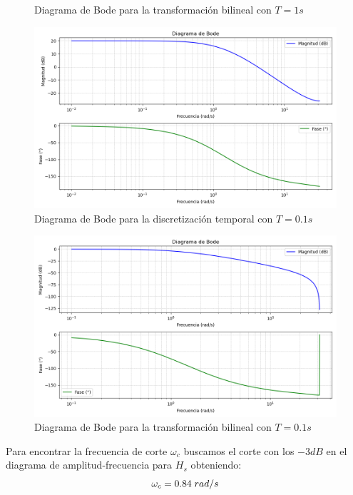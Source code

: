 \documentclass[a4paper,12pt]{report}
\begin{document}
\begin{enumerate}[label=\alph*), left=0pt]
\begin{figure}[H]
                \caption{Diagrama de Bode para la transformación bilineal con $T=1s$}
              \end{figure}
              \begin{figure}[H]
                \centering
                \includegraphics[width=1\linewidth]{./images/BodeD2.png}
                \caption{Diagrama de Bode para la discretización temporal con $T=0.1s$}
              \end{figure}
              \begin{figure}[H]
                \centering
                \includegraphics[width=1\linewidth]{./images/BodeB2.png}
                \caption{Diagrama de Bode para la transformación bilineal con $T=0.1s$}
              \end{figure}

              Para encontrar la frecuencia de corte $\omega_c$ buscamos el corte con los $-3dB$
              en el diagrama de amplitud-frecuencia para $H_s$ obteniendo:
              $$\omega_c=0.84 \hspace{1mm} rad/s$$


\end{enumerate}
\end{document}
